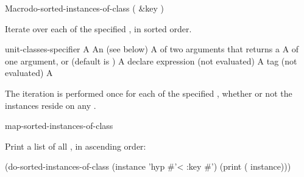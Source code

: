 \documentclass[10pt,twoside,english,pdftex]{article}
\begin{document}

\begin{functiondoc}{Macro}{do-sorted-instances-of-class}%
  {( \&key )
    }
%
%

\fnsyntax

\fnpurpose Iterate over each  of the specified
, in sorted order.

\fnpackage {}

\fnmodule {}

\fnargs
\begin{args}{unit-classes-specifier}
\arg[var] A 
 An 
(see below)
\arg[predicate] A  of two arguments that returns a
\arg[key] A  of one argument, or \nil{} (default is \nil)
\arg[declaration] A declare expression (not evaluated)
\arg[tag] A  tag (not evaluated)
\arg[form] A 
\end{args}

\fndsyntax
\W\supp\tabletop
\unitclassesspec
\subclassingspec

\fndescription The iteration is performed once for each 
of the specified , whether or not the instances reside on
any .

\begin{alsos}{map-sorted-instances-of-class}
\end{alsos}

\fnexample
Print a list of all  , in ascending order:
%
\W\supp
\begin{example}
  (do-sorted-instances-of-class (instance 'hyp #'< :key #')
     (print ( instance)))
\end{example} 

\end{functiondoc}

\end{document}
